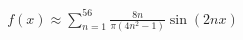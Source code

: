 \documentclass[preview]{standalone}
\begin{document}
\begin{align*}
f(x) \approx \sum_{n=1}^{56} \frac{8n}{\pi(4n^2-1)} \sin(2nx)
\end{align*}
\end{document}
